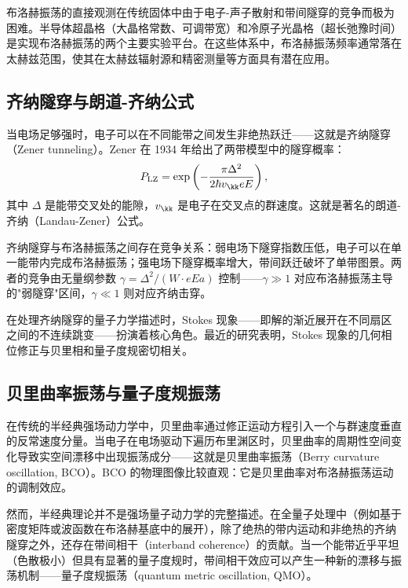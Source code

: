 布洛赫振荡的直接观测在传统固体中由于电子-声子散射和带间隧穿的竞争而极为困难。半导体超晶格（大晶格常数、可调带宽）和冷原子光晶格（超长弛豫时间）是实现布洛赫振荡的两个主要实验平台\cite{PhysRevLett.76.4508,PhysRevLett.83.4756}。在这些体系中，布洛赫振荡频率通常落在太赫兹范围，使其在太赫兹辐射源和精密测量等方面具有潜在应用。

\subsection{齐纳隧穿与朗道-齐纳公式}

当电场足够强时，电子可以在不同能带之间发生非绝热跃迁——这就是齐纳隧穿（Zener tunneling）。Zener 在 1934 年给出了两带模型中的隧穿概率\cite{zener1934theory}：
\begin{equation}
  P_\mathrm{LZ} = \exp\left( -\frac{\pi \Delta^2}{2\hbar v_\kk eE} \right),
\end{equation}
其中 $\Delta$ 是能带交叉处的能隙，$v_\kk$ 是电子在交叉点的群速度。这就是著名的朗道-齐纳（Landau-Zener）公式。

齐纳隧穿与布洛赫振荡之间存在竞争关系：弱电场下隧穿指数压低，电子可以在单一能带内完成布洛赫振荡；强电场下隧穿概率增大，带间跃迁破坏了单带图景。两者的竞争由无量纲参数 $\gamma = \Delta^2/(W \cdot eEa)$ 控制——$\gamma \gg 1$ 对应布洛赫振荡主导的"弱隧穿"区间，$\gamma \ll 1$ 则对应齐纳击穿。

在处理齐纳隧穿的量子力学描述时，Stokes 现象——即解的渐近展开在不同扇区之间的不连续跳变——扮演着核心角色。最近的研究表明，Stokes 现象的几何相位修正与贝里相和量子度规密切相关\cite{Quantum_Geometric_Oscillations}。

\subsection{贝里曲率振荡与量子度规振荡}

在传统的半经典强场动力学中，贝里曲率通过修正运动方程引入一个与群速度垂直的反常速度分量。当电子在电场驱动下遍历布里渊区时，贝里曲率的周期性空间变化导致实空间漂移中出现振荡成分——这就是贝里曲率振荡（Berry curvature oscillation, BCO）\cite{Quantum_Geometric_Oscillations}。BCO 的物理图像比较直观：它是贝里曲率对布洛赫振荡运动的调制效应。

然而，半经典理论并不是强场量子动力学的完整描述。在全量子处理中（例如基于密度矩阵或波函数在布洛赫基底中的展开），除了绝热的带内运动和非绝热的齐纳隧穿之外，还存在带间相干（interband coherence）的贡献。当一个能带近乎平坦（色散极小）但具有显著的量子度规时，带间相干效应可以产生一种新的漂移与振荡机制——量子度规振荡（quantum metric oscillation, QMO）。

